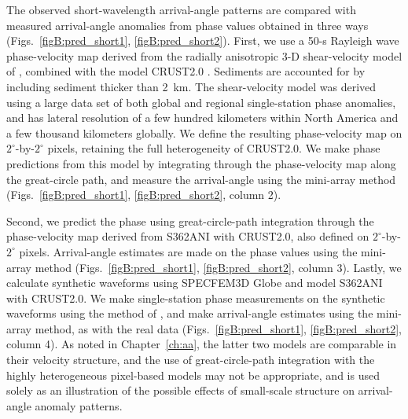 \documentclass[12pt,oneside]{book}
\newcommand{\degree}[1]{\mbox{$#1^{\circ}$}}
\begin{document}
The observed short-wavelength arrival-angle patterns are compared with measured arrival-angle anomalies from phase values obtained in three ways (Figs.~\ref{figB:pred_short1}, \ref{figB:pred_short2}). First, we use a 50-s Rayleigh wave phase-velocity map derived from the radially anisotropic 3\nobreakdash-D shear-velocity model of \citet{Nettles&Dziewonski2008}, combined with the model CRUST2.0 \citep{CRUST2}. Sediments are accounted for by including sediment thicker than 2~km. The shear-velocity model was derived using a large data set of both global and regional single-station phase anomalies, and has lateral resolution of a few hundred kilometers within North America and a few thousand kilometers globally. We define the resulting phase-velocity map on \degree{2}-by-\degree{2} pixels, retaining the full heterogeneity of CRUST2.0. We make phase predictions from this model by integrating through the phase-velocity map along the great-circle path, and measure the arrival-angle using the mini-array method (Figs.~\ref{figB:pred_short1}, \ref{figB:pred_short2}, column 2). 

Second, we predict the phase using great-circle-path integration through the phase-velocity map derived from S362ANI with CRUST2.0, also defined on \degree{2}-by-\degree{2} pixels. Arrival-angle estimates are made on the phase values using the mini-array method (Figs.~\ref{figB:pred_short1}, \ref{figB:pred_short2}, column 3). Lastly, we calculate synthetic waveforms using SPECFEM3D Globe \citep{KomatitschTromp2002a,KomatitschTromp2002b} and model S362ANI with CRUST2.0. We make single-station phase measurements on the synthetic waveforms using the method of \citet{Ekstrom1997}, and make arrival-angle estimates using the mini-array method, as with the real data (Figs.~\ref{figB:pred_short1}, \ref{figB:pred_short2}, column 4). As noted in Chapter~\ref{ch:aa}, the latter two models are comparable in their velocity structure, and the use of great-circle-path integration with the highly heterogeneous pixel-based models may not be appropriate, and is used solely as an illustration of the possible effects of small-scale structure on arrival-angle anomaly patterns. 
\end{document}
